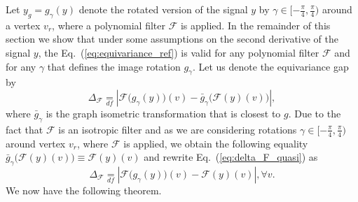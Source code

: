 \documentclass[10pt,journal,compsoc]{IEEEtran}
\newcommand{\df}{\mathop{=}\limits_{df}}
\newcommand{\mF}{\mathcal{F}}
\begin{document}
Let $y_g = g_\gamma(y)$ denote the rotated version of the signal $y$ by $\gamma \in [-\frac{\pi}{4},\frac{\pi}{4})$ around a vertex $v_r$, where a polynomial filter $\mF$ is applied. In the remainder of this section we show that under some assumptions on the second derivative of the signal $y$, the Eq.~(\ref{eq:equivariance_ref}) is valid for any polynomial filter $\mathcal{F}$ and for any $\gamma$ that defines the image rotation $g_\gamma$. Let us denote the equivariance gap by 
\begin{equation}
\Delta_\mathcal{F} \df \left| \mathcal{F}\big(g_{\gamma} (y)\big)(v) - \bar{g}_{\gamma}\big(\mathcal{F}(y)(v)\big) \right| ,
\label{eq:delta_F_quasi}
\end{equation}
where $\bar{g}_{\gamma}$ is the graph isometric transformation that is closest to $g$. Due to the fact that $\mF$ is an isotropic filter and as we are considering rotations $\gamma \in [-\frac{\pi}{4},\frac{\pi}{4})$ around vertex $v_r$, where $\mF$ is applied, we obtain the following equality $\bar{g}_{\gamma}\big(\mF(y)(v)\big) \equiv \mF(y)(v)$ and rewrite Eq.~(\ref{eq:delta_F_quasi}) as
\begin{equation}
\Delta_\mathcal{F} \df \left| \mathcal{F}\big(g_{\gamma} (y)\big)(v) - \mathcal{F}(y)(v) \right|, \forall v. 
\end{equation}
We now have the following theorem.
	
\end{document}
